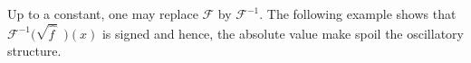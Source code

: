\documentclass[a4paper,11pt]{article}%
\theoremstyle{plain}
\theoremstyle{definition}
\numberwithin{equation}{section}
\newcommand{\R}{\mathbb{R}}
\newcommand{\ud}{\ensuremath{\mathrm{d}}}
\begin{document}

Up to a constant, one may replace $\mathcal{F}$ by $\mathcal{F}^{-1}$. The following example shows
that $\mathcal{F}^{-1}\big(\sqrt{\widehat{f\:}}\:\:\big)(x)$ is signed and hence, the absolute value
make spoil the oscillatory structure.
\end{document}
